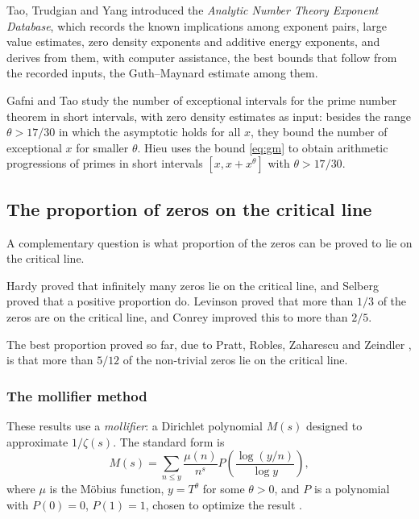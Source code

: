 \documentclass[11pt]{amsart}
\theoremstyle{definition}
\theoremstyle{remark}
\begin{document}
Tao, Trudgian and Yang \cite{tao2025} introduced the \emph{Analytic Number Theory Exponent Database}, which records the known implications among exponent pairs, large value estimates, zero density exponents and additive energy exponents, and derives from them, with computer assistance, the best bounds that follow from the recorded inputs, the Guth--Maynard estimate among them.

Gafni and Tao \cite{gafni2025} study the number of exceptional intervals for the prime number theorem in short intervals, with zero density estimates as input: besides the range $\theta>17/30$ in which the asymptotic holds for all $x$, they bound the number of exceptional $x$ for smaller $\theta$. Hieu \cite{hieu2025} uses the bound \eqref{eq:gm} to obtain arithmetic progressions of primes in short intervals $[x,x+x^{\theta}]$ with $\theta > 17/30$.

\subsection{The proportion of zeros on the critical line}\label{sec:proportion}

A complementary question is what proportion of the zeros can be proved to lie on the critical line.

Hardy \cite{hardy1914} proved that infinitely many zeros lie on the critical line, and Selberg \cite{selberg1942} proved that a positive proportion do. Levinson \cite{levinson1974} proved that more than $1/3$ of the zeros are on the critical line, and Conrey \cite{conrey1989} improved this to more than $2/5$.

The best proportion proved so far, due to Pratt, Robles, Zaharescu and Zeindler \cite{pratt2020}, is that more than $5/12$ of the non-trivial zeros lie on the critical line.

\subsubsection{The mollifier method}

These results use a \emph{mollifier}: a Dirichlet polynomial $M(s)$ designed to approximate $1/\zeta(s)$. The standard form is
\[
M(s) = \sum_{n \le y} \frac{\mu(n)}{n^s} P\!\left(\frac{\log(y/n)}{\log y}\right),
\]
where $\mu$ is the M\"obius function, $y = T^{\theta}$ for some $\theta > 0$, and $P$ is a polynomial with $P(0)=0$, $P(1)=1$, chosen to optimize the result \cite{conrey1989,levinson1974}.
\end{document}
